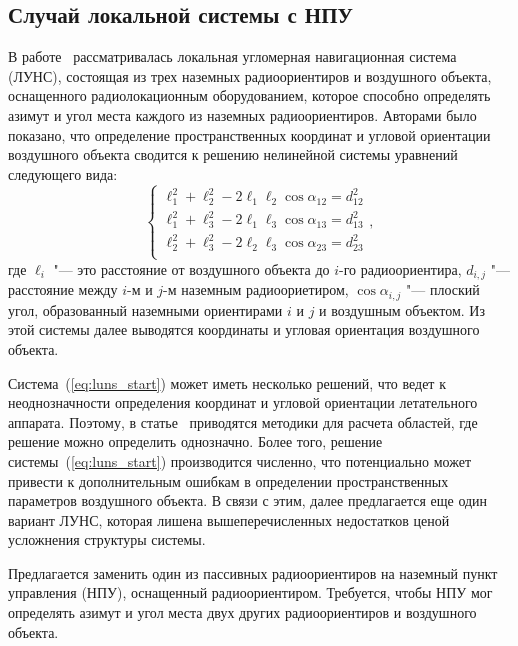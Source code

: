 \documentclass[../main.tex]{subfiles}
\begin{document}
\subsection{Случай локальной системы с НПУ}
В работе~\cite{antennas} рассматривалась локальная угломерная навигационная система (ЛУНС),
состоящая из трех наземных радиоориентиров и воздушного объекта, оснащенного радиолокационным
оборудованием, которое способно определять азимут и угол места каждого из наземных радиоориентиров.
Авторами было показано, что определение пространственных координат и угловой ориентации воздушного
объекта сводится к решению нелинейной системы уравнений следующего вида:
\begin{equation}\label{eq:luns_start}
    \begin{cases}
        \ell_1^2 + \ell_2^2 - 2 \ell_1 \ell_2 \cos \alpha_{12} = d_{12}^2 \\
        \ell_1^2 + \ell_3^2 - 2 \ell_1 \ell_3 \cos \alpha_{13} = d_{13}^2 \\
        \ell_2^2 + \ell_3^2 - 2 \ell_2 \ell_3 \cos \alpha_{23} = d_{23}^2 \\
    \end{cases},
\end{equation}
где $\ell_i$ "--- это расстояние от воздушного объекта до $i$-го радиоориентира, $d_{i,j}$
"--- расстояние между $i$-м и $j$-м наземным радиоориетиром, $\cos \alpha_{i,j}$ "---
плоский угол, образованный наземными ориентирами $i$ и $j$ и воздушным объектом. Из этой
системы далее выводятся координаты и угловая ориентация воздушного объекта.

Система~(\ref{eq:luns_start}) может иметь несколько решений, что ведет к неоднозначности определения
координат и угловой ориентации летательного аппарата. Поэтому, в статье~\cite{antennas} приводятся
методики для расчета областей, где решение можно определить однозначно. Более того, решение системы~(\ref{eq:luns_start})
производится численно, что потенциально может привести к дополнительным ошибкам в определении
пространственных параметров воздушного объекта. В связи с этим, далее предлагается еще один
вариант ЛУНС, которая лишена вышеперечисленных недостатков ценой усложнения структуры системы.

Предлагается заменить один из пассивных радиоориентиров на наземный пункт управления (НПУ), оснащенный
радиоориентиром. Требуется, чтобы НПУ мог определять азимут и угол места двух других радиоориентиров
и воздушного объекта.
\end{document}
